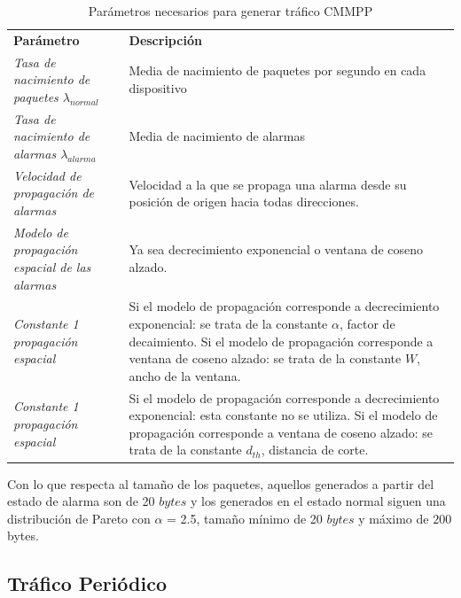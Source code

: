 \begin{table}
    \caption{Parámetros necesarios para generar tráfico CMMPP}
    \label{tab:ParametrosTraficoCMMPP}
    \centering
    \begin{tabular}{|m{6cm}|p{10cm}|} \\ 
    \textbf{Parámetro} & \textbf{Descripción} \\ 
    \textit{Tasa de nacimiento de paquetes $\lambda_{normal}$}  & \footnotesize{ Media de nacimiento de paquetes por segundo en cada dispositivo } \\ \hline 
    \textit{Tasa de nacimiento de alarmas $\lambda_{alarma}$}  & \footnotesize{ Media de nacimiento de alarmas } \\ \hline 
    \textit{Velocidad de propagación de alarmas}  & \footnotesize{ Velocidad a la que se propaga una alarma desde su posición de origen hacia todas direcciones. } \\ \hline 
    \textit{Modelo de propagación espacial de las alarmas} & \footnotesize{ Ya sea decrecimiento exponencial o ventana de coseno alzado. } \\ \hline 
    \textit{Constante 1 propagación espacial} & \footnotesize{ Si el modelo de propagación corresponde a decrecimiento exponencial:
    se trata de la constante $\alpha$, factor de decaimiento.
    Si el modelo de propagación corresponde a ventana de coseno alzado:
    se trata de la constante $W$, ancho de la ventana. } \\ \hline 
    \textit{Constante 1 propagación espacial} & \footnotesize{ Si el modelo de propagación corresponde a decrecimiento exponencial:
    esta constante no se utiliza.
    Si el modelo de propagación corresponde a ventana de coseno alzado:
    se trata de la constante $d_{th}$, distancia de corte. } \\ \hline 
    \end{tabular}
\end{table}

    Con lo que respecta al tamaño de los paquetes, aquellos generados a partir del estado de alarma son de 20 $bytes$ y los generados en el estado normal siguen una distribución de Pareto con $\alpha$ = 2.5, tamaño mínimo de 20 $bytes$ y máximo de $200$ bytes.\newline

\subsection{Tráfico Periódico}

